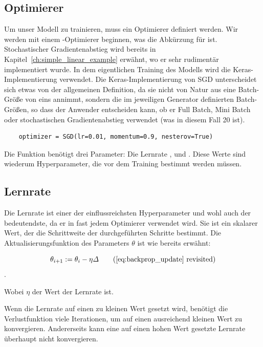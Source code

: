 \subsection{Optimierer}

Um unser Modell zu trainieren, muss ein Optimierer definiert werden.
Wir werden mit einem -Optimierer beginnen, was die Abkürzung für  ist.
Stochastischer Gradientenabstieg wird bereits in Kapitel~\ref{ch:simple_linear_example} erwähnt, wo er sehr rudimentär implementiert wurde. In dem eigentlichen Training des Modells wird die Keras-Implementierung verwendet.
Die Keras-Implementierung von SGD unterscheidet sich etwas von der allgemeinen Definition, da sie nicht von Natur aus eine Batch-Größe von eins annimmt, sondern die im jeweiligen Generator definierten Batch-Größen, so dass der Anwender entscheiden kann, ob er Full Batch, Mini Batch oder stochastischen Gradientenabstieg verwendet (was in diesem Fall 20 ist).

\begin{lstlisting}
    optimizer = SGD(lr=0.01, momentum=0.9, nesterov=True)
\end{lstlisting}

Die Funktion  benötigt drei Parameter: Die Lernrate ,  und .
Diese Werte sind wiederum Hyperparameter, die vor dem Training bestimmt werden müssen.

\subsection{Lernrate}

Die Lernrate ist einer der einflussreichsten Hyperparameter und wohl auch der bedeutendste, da er in fast jedem Optimierer verwendet wird.
Sie ist ein skalarer Wert, der die Schrittweite der durchgeführten Schritte bestimmt. Die Aktualisierungsfunktion des Parameters $\theta$ ist wie bereits erwähnt:

\begin{equation}
    \theta_{i+1} := \theta_i - \eta \varDelta \tag{\ref{eq:backprop_update} revisited}
\end{equation}.

Wobei $\eta$ der Wert der Lernrate ist.

Wenn die Lernrate auf einen zu kleinen Wert gesetzt wird, benötigt die Verlustfunktion viele Iterationen, um auf einen ausreichend kleinen Wert zu konvergieren.
Andererseits kann eine auf einen hohen Wert gesetzte Lernrate überhaupt nicht konvergieren.

